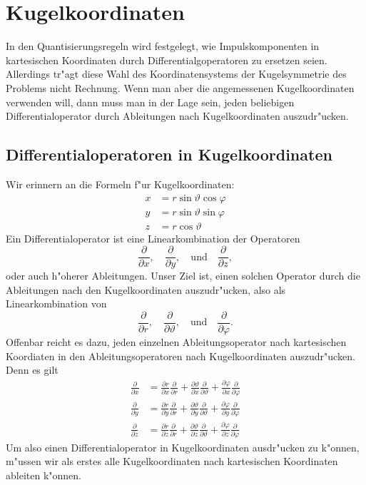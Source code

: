 \chapter{Kugelkoordinaten\label{chapter:kugelkoordinaten}}
\rhead{}
In den Quantisierungsregeln wird festgelegt, wie Impulskomponenten
in kartesischen Koordinaten durch Differentialgoperatoren zu
ersetzen seien.
Allerdings tr"agt diese Wahl des Koordinatensystems der Kugelsymmetrie
des Problems nicht Rechnung. 
Wenn man aber die angemessenen Kugelkoordinaten verwenden will,
dann muss man in der Lage sein, jeden beliebigen Differentialoperator
durch Ableitungen nach Kugelkoordinaten auszudr"ucken.

\section{Differentialoperatoren in Kugelkoordinaten}
Wir erinnern an die Formeln f"ur Kugelkoordinaten:
\begin{align*}
x&=
r\sin\vartheta\cos\varphi
\\
y&=
r\sin\vartheta\sin\varphi
\\
z&=
r\cos\vartheta
\end{align*}
Ein Differentialoperator ist eine Linearkombination der Operatoren
\[
\frac{\partial}{\partial x},
\quad
\frac{\partial}{\partial y},
\quad\text{und}\quad
\frac{\partial}{\partial z},
\]
oder auch h"oherer Ableitungen.  Unser Ziel ist, einen solchen Operator
durch die Ableitungen nach den Kugelkoordinaten auszudr"ucken, also
als Linearkombination von
\[
\frac{\partial}{\partial r},
\quad
\frac{\partial}{\partial \vartheta},
\quad\text{und}\quad
\frac{\partial}{\partial \varphi}.
\]
Offenbar reicht es dazu, jeden einzelnen Ableitungsoperator nach kartesischen
Koordiaten in den Ableitungsoperatoren nach Kugelkoordinaten auszudr"ucken.
Denn es gilt
\begin{align*}
\frac{\partial}{\partial x}
&=
\frac{\partial r}{\partial x} \frac{\partial}{\partial r}
+
\frac{\partial \vartheta}{\partial x} \frac{\partial}{\partial \vartheta}
+
\frac{\partial \varphi}{\partial x} \frac{\partial}{\partial \varphi}
\\
\frac{\partial}{\partial y}
&=
\frac{\partial r}{\partial y} \frac{\partial}{\partial r}
+
\frac{\partial \vartheta}{\partial y} \frac{\partial}{\partial \vartheta}
+
\frac{\partial \varphi}{\partial y} \frac{\partial}{\partial \varphi}
\\
\frac{\partial}{\partial z}
&=
\frac{\partial r}{\partial z} \frac{\partial}{\partial r}
+
\frac{\partial \vartheta}{\partial z} \frac{\partial}{\partial \vartheta}
+
\frac{\partial \varphi}{\partial z} \frac{\partial}{\partial \varphi}
\end{align*}
Um also einen Differentialoperator in Kugelkoordinaten ausdr"ucken zu
k"onnen, m"ussen wir als erstes alle Kugelkoordinaten nach kartesischen
Koordinaten ableiten k"onnen.

